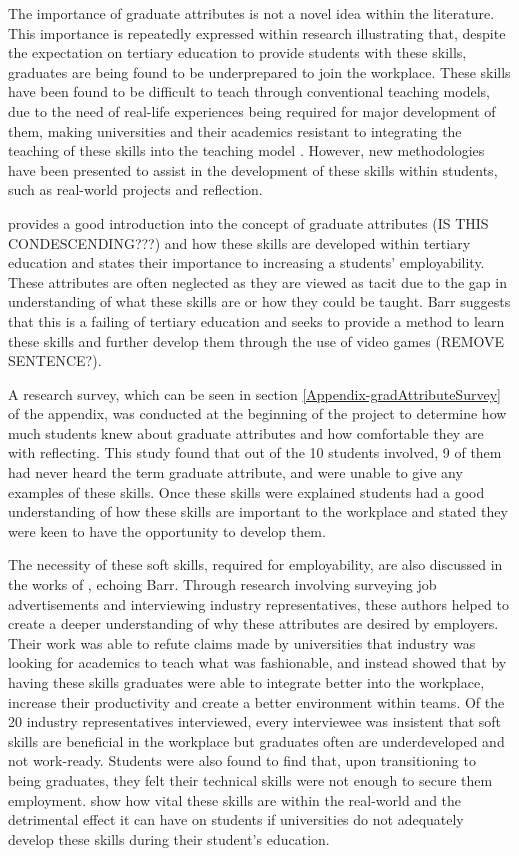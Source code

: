 \documentclass{l4proj}
\begin{document}
The importance of graduate attributes is not a novel idea within the literature. This importance is repeatedly expressed within research illustrating that, despite the expectation on tertiary education to provide students with these skills, graduates are being found to be underprepared to join the workplace. These skills have been found to be difficult to teach through conventional teaching models, due to the need of real-life experiences being required for major development of them, making universities and their academics resistant to integrating the teaching of these skills into the teaching model \citep{barr_2019}. However, new methodologies have been presented to assist in the development of these skills within students, such as real-world projects and reflection.
 
\citet{barr_2019} provides a good introduction into the concept of graduate attributes (IS THIS CONDESCENDING???) and how these skills are developed within tertiary education and states their importance to increasing a students’ employability. These attributes are often neglected as they are viewed as tacit due to the gap in understanding of what these skills are or how they could be taught. Barr suggests that this is a failing of tertiary education and seeks to provide a method to learn these skills and further develop them through the use of video games (REMOVE SENTENCE?). 

A research survey, which can be seen in section \ref{Appendix-gradAttributeSurvey} of the appendix, was conducted at the beginning of the project to determine how much students knew about graduate attributes and how comfortable they are with reflecting. This study found that out of the 10 students involved, 9 of them had never heard the term graduate attribute, and were unable to give any examples of these skills. Once these skills were explained students had a good understanding of how these skills are important to the workplace and stated they were keen to have the opportunity to develop them. 

The necessity of these soft skills, required for employability, are also discussed in the works of \citet{stevens_industry_2016}, echoing Barr. Through research involving surveying job advertisements and interviewing industry representatives, these authors helped to create a deeper understanding of why these attributes are desired by employers. Their work was able to refute claims made by universities that industry was looking for academics to teach what was fashionable, and instead showed that by having these skills graduates were able to integrate better into the workplace, increase their productivity and create a better environment within teams. Of the 20 industry representatives interviewed, every interviewee was insistent that soft skills are beneficial in the workplace but graduates often are underdeveloped and not work-ready. Students were also found to find that, upon transitioning to being graduates, they felt their technical skills were not enough to secure them employment. \citet{stevens_industry_2016} show how vital these skills are within the real-world and the detrimental effect it can have on students if universities do not adequately develop these skills during their student's education.
\end{document}
